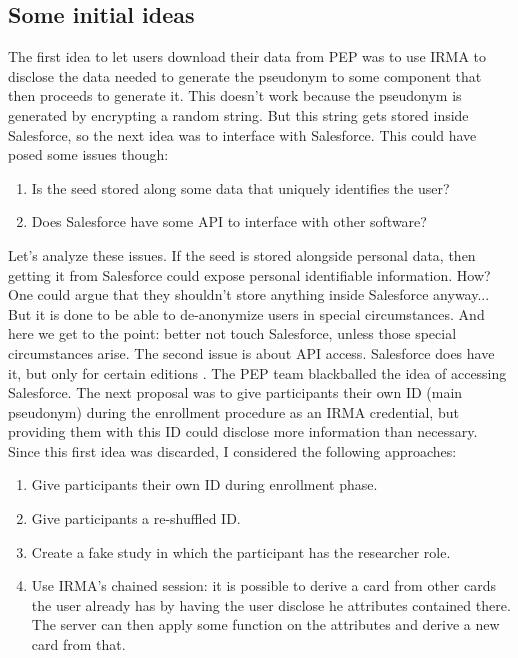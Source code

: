 \documentclass{report}
\begin{document}
\iffalse
\subsection{Some initial ideas}
The first idea to let users download their data from PEP was to use IRMA to disclose the data needed to generate the pseudonym to some component that then proceeds to generate it.
This doesn't work because the pseudonym is generated by encrypting a random string. But this string gets stored inside Salesforce, so the next idea was to interface with
Salesforce. This could have posed some issues though:
\begin{enumerate}
		\item Is the seed stored along some data that uniquely identifies the user?
		\item Does Salesforce have some API to interface with other software?
\end{enumerate}
Let's analyze these issues. If the seed is stored alongside personal data, then getting it from Salesforce could expose personal identifiable information. How? One could argue that
they shouldn't store anything inside Salesforce anyway... But it is done to be able to de-anonymize users in special circumstances. And here we get to the point: better not touch
Salesforce, unless those special circumstances arise. The second issue is about API access. Salesforce does have it, but only for certain editions \cite{salesforce}. The PEP team
blackballed the idea of accessing Salesforce. The next proposal was to give participants their own ID (main pseudonym) during the enrollment procedure as an IRMA credential, but
providing them with this ID could disclose more information than necessary.
Since this first idea was discarded, I considered the following approaches:
\begin{enumerate}
		\item Give participants their own ID during enrollment phase.
		\item Give participants a re-shuffled ID.
		\item Create a fake study in which the participant has the researcher role.
		\item Use IRMA’s chained session: it is possible to derive a card from other cards the user already has by having the user disclose he attributes contained there. The server can then apply some function on the attributes and derive a new card from that.
\end{enumerate}
\end{document}
